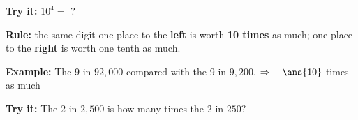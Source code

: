 \documentclass[12pt]{article}
\begin{document}
\begin{tryitbox}
\textbf{Try it:} \quad $10^4 = $ ?\\[2pt]
\end{tryitbox}


\begin{formulabox}
\textbf{Rule:} the same digit one place to the \textbf{left} is worth
\textbf{10 times} as much; one place to the \textbf{right} is worth one tenth
as much.
\end{formulabox}

\begin{examplebox}
\textbf{Example:} \quad The 9 in $92{,}000$ compared with the 9 in $9{,}200$.
$\Rightarrow\quad \ans{10}$ times as much
\end{examplebox}

\begin{tryitbox}
\textbf{Try it:} \quad The 2 in $2{,}500$ is how many times the 2 in $250$?\\[2pt]
\end{tryitbox}
\end{document}
